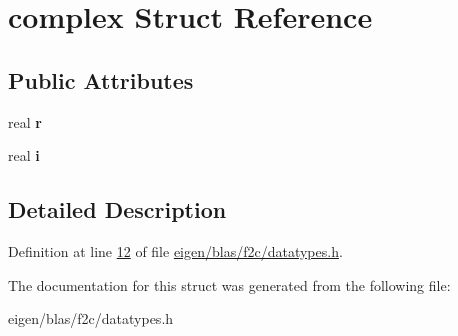 \hypertarget{structcomplex}{}\section{complex Struct Reference}
\label{structcomplex}
\subsection*{Public Attributes}
\begin{DoxyCompactItemize}
\item 
\mbox{\label{structcomplex_a03cba9844d71e49f4ddf7c5f3dd45822}} 
real {\bfseries r}
\item 
\mbox{\label{structcomplex_aa55283d87e8d89c794bac746fb11d524}} 
real {\bfseries i}
\end{DoxyCompactItemize}


\subsection{Detailed Description}


Definition at line \hyperlink{eigen_2blas_2f2c_2datatypes_8h_source_l00012}{12} of file \hyperlink{eigen_2blas_2f2c_2datatypes_8h_source}{eigen/blas/f2c/datatypes.\+h}.



The documentation for this struct was generated from the following file\+:\begin{DoxyCompactItemize}
\item 
eigen/blas/f2c/datatypes.\+h\end{DoxyCompactItemize}
